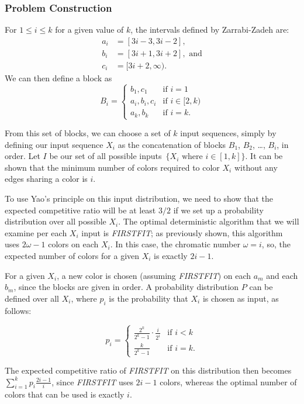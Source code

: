 \subsubsection{Problem Construction}
For $1\le i\le k$ for a given value of $k$, the intervals defined by Zarrabi-Zadeh \cite{zarrabi} are:
\begin{align*}
	a_i &= [3i-3, 3i-2], \\
	b_i &= [3i+1, 3i+2],\textrm{ and} \\
	c_i &= [3i+2, \infty).
\end{align*}
We can then define a block as
$$B_i = \begin{cases} {b_1, c_1} &\mbox{if } i = 1 \\
{a_i, b_i, c_i} & \mbox{if } i \in [2,k) \\
 {a_k, b_k} &\mbox{if } i = k. \end{cases}$$

From this set of blocks, we can choose a set of $k$ input sequences, simply by defining our input sequence $X_i$ as the concatenation of blocks $B_1$, $B_2$, \ldots, $B_i$, in order. Let $I$ be our set of all possible inputs~$\{X_i \text{ where } i \in [1,k]\}$. It can be shown that the minimum number of colors required to color $X_i$ without any edges sharing a color is $i$.

To use Yao's principle on this input distribution, we need to show that the expected competitive ratio will be at least $3/2$ if we set up a probability distribution over all possible $X_i$. The optimal deterministic algorithm that we will examine per each $X_i$ input is \emph{FIRSTFIT}; as previously shown, this algorithm uses $2\omega-1$ colors on each $X_i$. In this case, the chromatic number $\omega=i$, so, the expected number of colors for a given $X_i$ is exactly $2i-1$.

For a given $X_i$, a new color is chosen (assuming \emph{FIRSTFIT}) on each $a_m$ and each $b_m$, since the blocks are given in order. A probability distribution $P$ can be defined over all $X_i$, where $p_i$ is the probability that $X_i$ is chosen as input, as follows:

\[p_i = \begin{cases} \frac{2^k}{2^k-1}\cdot\frac{i}{2^i} &\mbox{if } i < k \\
\frac{k}{2^k-1} & \mbox{if } i = k.
 \end{cases}\]

The expected competitive ratio of \emph{FIRSTFIT} on this distribution then becomes $\sum_{i=1}^k p_i\frac{2i-1}{i}$, since \emph{FIRSTFIT} uses $2i-1$ colors, whereas the optimal number of colors that can be used is exactly $i$.

